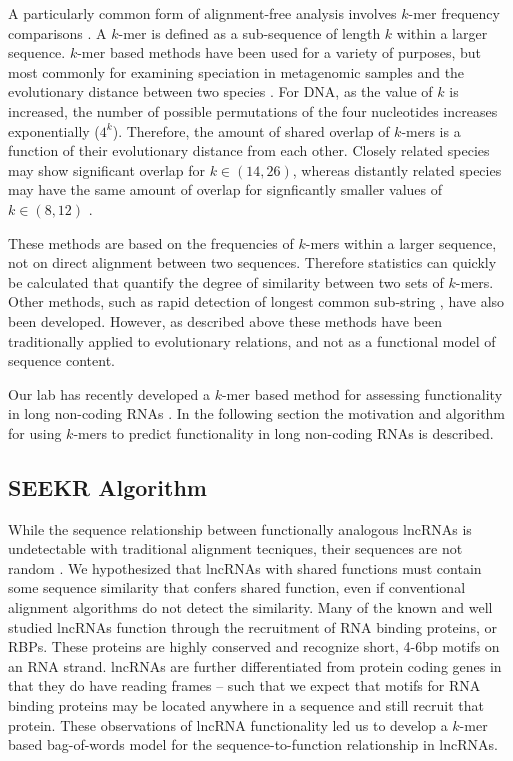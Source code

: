 A particularly common form of alignment-free analysis involves $k$-mer frequency comparisons \cite{Haubold2014Alignment-freeGenetics}. A $k$-mer is defined as a sub-sequence of length $k$ within a larger sequence. $k$-mer based methods have been used for a variety of purposes, but most commonly for examining speciation in metagenomic samples and the evolutionary distance between two species \cite{Sims2011Whole-genomeFFPs,Yang2008PerformanceReconstruction,Yi2013Co-phylog:Organisms,Qi2004WholeApproach}. For DNA, as the value of $k$ is increased, the number of possible permutations of the four nucleotides increases exponentially ($4^k$). Therefore, the amount of shared overlap of $k$-mers is a function of their evolutionary distance from each other. Closely related species may show significant overlap for $k\in(14,26)$, whereas distantly related species may have the same amount of overlap for signficantly smaller values of $k\in(8,12)$ \cite{Qi2004WholeApproach,Yi2013Co-phylog:Organisms,Sims2011Whole-genomeFFPs}. 

These methods are based on the frequencies of $k$-mers within a larger sequence, not on direct alignment between two sequences. Therefore statistics can quickly be calculated that quantify the degree of similarity between two sets of $k$-mers. Other methods, such as rapid detection of longest common sub-string \cite{Ulitsky2006TheReconstruction}, have also been developed. However, as described above these methods have been traditionally applied to evolutionary relations, and not as a functional model of sequence content. 

Our lab has recently developed a $k$-mer based method for assessing functionality in long non-coding RNAs \cite{Kirk2018FunctionalContent}. In the following section the motivation and algorithm for using $k$-mers to predict functionality in long non-coding RNAs is described. 

\subsection{SEEKR Algorithm}

 While the sequence relationship between functionally analogous lncRNAs is undetectable with traditional alignment tecniques, their sequences are not random \cite{Brown10TheNucleus.,Brockdorff2018LocalNcRNA,Kirk2018FunctionalContent,Sprague2019NonlinearDomains,Wang2017TargetingGuanines,Zhao2008PolycombChromosome,Pintacuda2017HnRNPKSilencing}. We hypothesized that lncRNAs with shared functions must contain some sequence similarity that confers shared function, even if conventional alignment algorithms do not detect the similarity. Many of the known and well studied lncRNAs function through the recruitment of RNA binding proteins, or RBPs. These proteins are highly conserved and recognize short, 4-6bp motifs on an RNA strand. lncRNAs are further differentiated from protein coding genes in that they do have reading frames -- such that we expect that motifs for RNA binding proteins may be located anywhere in a sequence and still recruit that protein. These observations of lncRNA functionality led us to develop a $k$-mer based bag-of-words model for the sequence-to-function relationship in lncRNAs.
 
